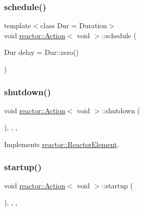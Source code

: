 \subsubsection{\texorpdfstring{schedule()}{schedule()}}
{\footnotesize\ttfamily template$<$class Dur  = Duration$>$ \\
void \hyperlink{classreactor_1_1Action}{reactor\+::\+Action}$<$ void $>$\+::schedule (\begin{DoxyParamCaption}\item[{Dur}]{delay = {\ttfamily Dur\+:\+:zero()} }\end{DoxyParamCaption})}

\mbox{\label{classreactor_1_1Action_3_01void_01_4_a871645e568af7688eeacefbb65be4489}} 
\subsubsection{\texorpdfstring{shutdown()}{shutdown()}}
{\footnotesize\ttfamily void \hyperlink{classreactor_1_1Action}{reactor\+::\+Action}$<$ void $>$\+::shutdown (\begin{DoxyParamCaption}{ }\end{DoxyParamCaption})\hspace{0.3cm}{\ttfamily [inline]}, {\ttfamily [final]}, {\ttfamily [override]}, {\ttfamily [virtual]}}



Implements \hyperlink{classreactor_1_1ReactorElement_a8fce084bef582156979ebba56737e907}{reactor\+::\+Reactor\+Element}.

\mbox{\label{classreactor_1_1Action_3_01void_01_4_a6ba1aa14251401ebb7a4b13624d5ce92}} 
\subsubsection{\texorpdfstring{startup()}{startup()}}
{\footnotesize\ttfamily void \hyperlink{classreactor_1_1Action}{reactor\+::\+Action}$<$ void $>$\+::startup (\begin{DoxyParamCaption}{ }\end{DoxyParamCaption})\hspace{0.3cm}{\ttfamily [inline]}, {\ttfamily [final]}, {\ttfamily [override]}, {\ttfamily [virtual]}}



